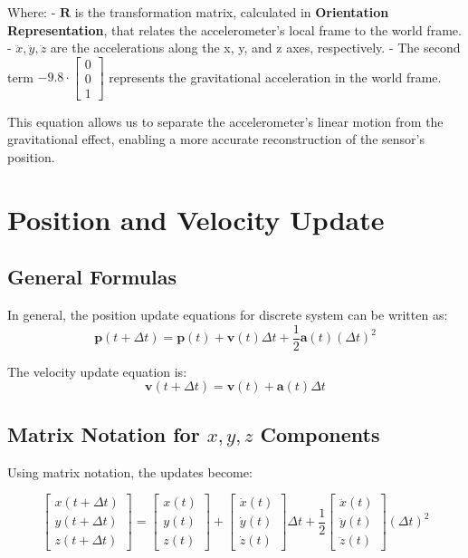 \documentclass[12pt]{article}
\begin{document}
Where:
- \( \mathbf{R} \) is the transformation matrix, calculated in \textbf{Orientation Representation}, that relates the accelerometer's local frame to the world frame.
- \( \ddot{x}, \ddot{y}, \ddot{z} \) are the accelerations along the x, y, and z axes, respectively.
- The second term \( -9.8 \cdot \begin{bmatrix} 0 \\ 0 \\ 1 \end{bmatrix} \) represents the gravitational acceleration in the world frame.

This equation allows us to separate the accelerometer’s linear motion from the gravitational effect, enabling a more accurate reconstruction of the sensor's position.




\section*{Position and Velocity Update}

\subsection*{General Formulas}

In general, the position update equations for discrete system can be written as:
\[
\mathbf{p}(t + \Delta t) = \mathbf{p}(t) + \mathbf{v}(t) \Delta t + \frac{1}{2} \mathbf{a}(t) (\Delta t)^2
\]

The velocity update equation is:
\[
\mathbf{v}(t + \Delta t) = \mathbf{v}(t) + \mathbf{a}(t) \Delta t
\]

\subsection*{Matrix Notation for \(x, y, z\) Components}

Using matrix notation, the updates become:

\[
\begin{bmatrix} x(t+ \Delta t) \\ y(t+ \Delta t) \\ z(t+ \Delta t) \end{bmatrix}
= 
\begin{bmatrix} x(t) \\ y(t) \\ z(t) \end{bmatrix}
+ 
\begin{bmatrix} \dot{x}(t) \\ \dot{y}(t) \\ \dot{z}(t) \end{bmatrix} \Delta t
+ \frac{1}{2}
\begin{bmatrix} \ddot{x}(t) \\ \ddot{y}(t) \\ \ddot{z}(t) \end{bmatrix} (\Delta t)^2
\]
\end{document}
